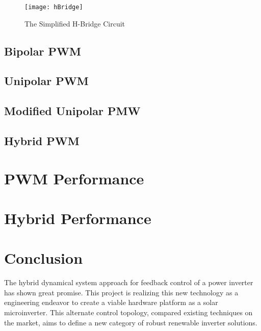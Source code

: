 \begin{figure}
\centering
\texttt{[image: hBridge]}
\caption{The Simplified H-Bridge Circuit}
\label{hBridge}
\end{figure}


\subsection{Bipolar PWM}
\subsection{Unipolar PWM}
\subsection{Modified Unipolar PMW}
\subsection{Hybrid PWM}

\section{PWM Performance}

\section{Hybrid Performance}

\section{Conclusion}
The hybrid dynamical system approach for feedback control of a power inverter has shown great promise. This project is realizing this new technology as a engineering endeavor to create a viable hardware platform as a solar microinverter. This alternate control topology, compared existing techniques on the market, aims to define a new category of robust renewable inverter solutions.